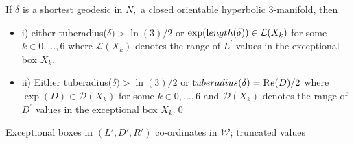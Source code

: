 \begin{remark}
\begin{corollary}\label{GMT 1.29}
If $\delta$ is a shortest geodesic in $N,$ a closed orientable
hyperbolic $3$\/{\textrm -}\/manifold{\textrm ,} then 
\begin{itemize}
\item{i)}  either {\textrm tuberadius(}$\delta) > \ln(3)/2$ or
$\exp({\textrm length}(\delta))\in {\mathcal L}(X_k)$ for some\break $k\in {0,\ldots,6}$
 where ${\mathcal L}(X_k)$
denotes the range of $L^\prime$ values in the 
exceptional box $X_k.$ 

\item{ii)} Either {\textrm tuberadius(}$\delta) > \ln(3)/2$ or
${\textrm tuberadius}(\delta) = {\mathrm Re}(D)/2$ where\break $\exp(D)
\in {\mathcal D}(X_k)$ for some $k\in {0,\ldots,6}$
 and ${\mathcal D}(X_k)$
denotes the range of $D^\prime$ values in the 
exceptional box $X_k.$\hfill\qed
\end{itemize}

\end{corollary}

 
\begin{table}\label{GMT tab 1.1}
\caption{Exceptional boxes in $(L',D',R')$ co-ordinates in ${\mathcal W}$; truncated values}
 

\end{table}
\end{remark}
